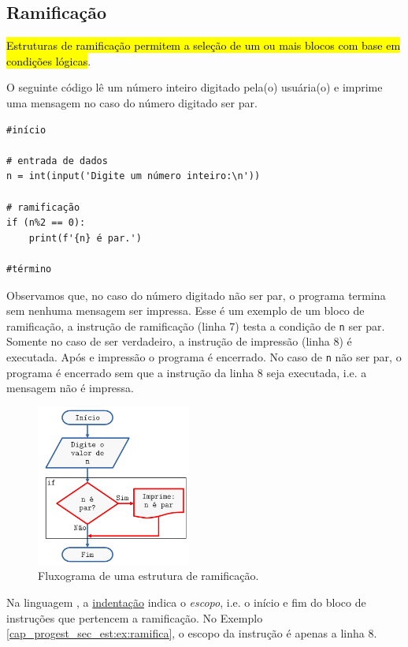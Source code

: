 \subsection{Ramificação}

\hl{Estruturas de ramificação permitem a seleção de um ou mais blocos com base em condições lógicas}.

\begin{ex}\label{cap_progest_sec_est:ex:ramifica}
  O seguinte código lê um número inteiro digitado pela(o) usuária(o) e imprime uma mensagem no caso do número digitado ser par.

\begin{lstlisting}
#início

# entrada de dados
n = int(input('Digite um número inteiro:\n'))

# ramificação
if (n%2 == 0):
    print(f'{n} é par.')

#término
\end{lstlisting}

Observamos que, no caso do número digitado não ser par, o programa termina sem nenhuma mensagem ser impressa. Esse é um exemplo de um bloco de ramificação, a instrução de ramificação (linha 7) testa a condição de \lstinline+n+ ser par. Somente no caso de ser verdadeiro, a instrução de impressão (linha 8) é executada. Após e impressão o programa é encerrado. No caso de \lstinline+n+ não ser par, o programa é encerrado sem que a instrução da linha 8 seja executada, i.e. a mensagem não é impressa.

\begin{figure}[H]
  \centering
  \includegraphics[width=2in]{./cap_progest/dados/fig_fg_ramifica/fig.png}
  \caption{Fluxograma de uma estrutura de ramificação.}
  \label{cap_progest:fig:fg_ramifica}
\end{figure}
  
\end{ex}

\begin{obs}
  Na linguagem {\python}, a \href{https://pt.wikipedia.org/wiki/Indenta\%C3\%A7\%C3\%A3o}{indentação} indica o \emph{escopo}, i.e. o início e fim do bloco de instruções que pertencem a ramificação. No Exemplo \ref{cap_progest_sec_est:ex:ramifica}, o escopo da instrução {\PYTHONif} é apenas a linha 8.
\end{obs}

